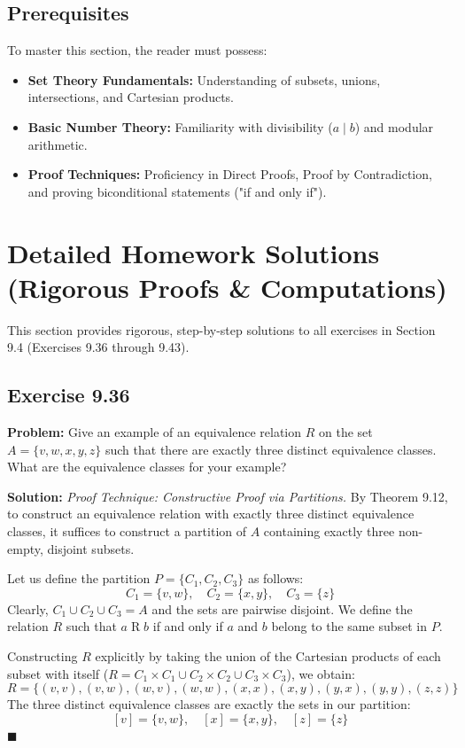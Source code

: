 \documentclass[11pt, a4paper]{article}
\theoremstyle{definition}
\theoremstyle{remark}
\begin{document}
\subsection{Prerequisites}
To master this section, the reader must possess:
\begin{itemize}
    \item \textbf{Set Theory Fundamentals:} Understanding of subsets, unions, intersections, and Cartesian products.
    \item \textbf{Basic Number Theory:} Familiarity with divisibility ($a \mid b$) and modular arithmetic.
    \item \textbf{Proof Techniques:} Proficiency in Direct Proofs, Proof by Contradiction, and proving biconditional statements ("if and only if").
\end{itemize}

\newpage
\section{Detailed Homework Solutions (Rigorous Proofs \& Computations)}

This section provides rigorous, step-by-step solutions to all exercises in Section 9.4 (Exercises 9.36 through 9.43).

\subsection*{Exercise 9.36}
\textbf{Problem:} Give an example of an equivalence relation $R$ on the set $A = \{v, w, x, y, z\}$ such that there are exactly three distinct equivalence classes. What are the equivalence classes for your example?

\textbf{Solution:}
\textit{Proof Technique: Constructive Proof via Partitions.}
By Theorem 9.12, to construct an equivalence relation with exactly three distinct equivalence classes, it suffices to construct a partition of $A$ containing exactly three non-empty, disjoint subsets. 

Let us define the partition $P = \{ C_1, C_2, C_3 \}$ as follows:
\[
    C_1 = \{v, w\}, \quad C_2 = \{x, y\}, \quad C_3 = \{z\}
\]
Clearly, $C_1 \cup C_2 \cup C_3 = A$ and the sets are pairwise disjoint. We define the relation $R$ such that $a \mathrel{R} b$ if and only if $a$ and $b$ belong to the same subset in $P$. 

Constructing $R$ explicitly by taking the union of the Cartesian products of each subset with itself ($R = C_1 \times C_1 \cup C_2 \times C_2 \cup C_3 \times C_3$), we obtain:
\[
    R = \{ (v,v), (v,w), (w,v), (w,w), (x,x), (x,y), (y,x), (y,y), (z,z) \}
\]
The three distinct equivalence classes are exactly the sets in our partition:
\[
    [v] = \{v, w\}, \quad [x] = \{x, y\}, \quad [z] = \{z\}
\]
$\blacksquare$
\end{document}
